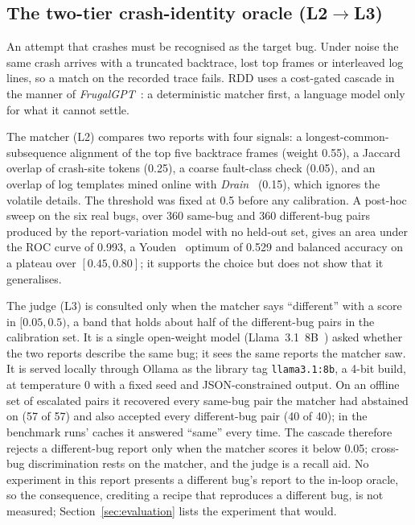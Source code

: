 \subsection{The two-tier crash-identity oracle (L2\texorpdfstring{$\rightarrow$}{ to }L3)}

An attempt that crashes must be recognised as the target bug. Under noise the same
crash arrives with a truncated backtrace, lost top frames or interleaved log
lines, so a match on the recorded trace fails. RDD uses a cost-gated cascade in the manner of
\emph{FrugalGPT}~\cite{frugalgpt2023}: a deterministic matcher first, a language
model only for what it cannot settle.

The matcher (L2) compares two reports with four signals: a longest-common-subsequence
alignment of the top five backtrace frames (weight 0.55), a Jaccard overlap of
crash-site tokens (0.25), a coarse fault-class check (0.05), and an overlap of log
templates mined online with \emph{Drain}~\cite{drain2017} (0.15), which ignores
the volatile details. The threshold was fixed at 0.5 before any calibration. A
post-hoc sweep on the six real bugs, over 360 same-bug and 360 different-bug pairs
produced by the report-variation model with no held-out set, gives an area under
the ROC curve of 0.993, a Youden~\cite{youden1950} optimum of 0.529 and balanced
accuracy on a plateau over $[0.45, 0.80]$; it supports the choice but does not
show that it generalises. %

The judge (L3) is consulted only when the matcher says ``different'' with a score
in $[0.05, 0.5)$, a band that holds about half of the different-bug pairs in the
calibration set. It is a single open-weight model (Llama~3.1~8B~\cite{llama3_2024})
asked whether the two reports describe the same bug; it sees the same reports the
matcher saw. It is served locally through Ollama as the library tag
\texttt{llama3.1:8b}, a 4-bit build, at temperature 0 with a fixed seed and
JSON-constrained output. On an offline set of escalated pairs it recovered every same-bug pair the
matcher had abstained on (57 of 57) and also accepted every different-bug pair
(40 of 40); in the benchmark runs' caches it answered ``same'' every time. %
The cascade therefore rejects a different-bug report only when the matcher scores
it below 0.05; cross-bug discrimination rests on the matcher, and the judge is a
recall aid. No experiment in this report presents a different bug's report to the
in-loop oracle, so the consequence, crediting a recipe that reproduces a different
bug, is not measured; Section~\ref{sec:evaluation} lists the experiment that
would.

